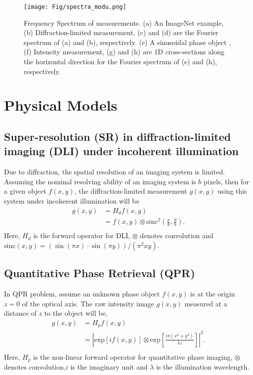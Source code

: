 \documentclass[10pt,twocolumn,letterpaper]{article}
\begin{document}
\begin{figure*}[h]
\centering\texttt{[image: Fig/spectra\_modu.png]}
\caption{Frequency Spectrum of measurements. (a) An ImageNet example, (b) Diffraction-limited measurement, (c) and (d) are the Fourier spectrum of (a) and (b), respectively. (e) A sinusoidal phase object , (f) Intensity measurement, (g) and (h) are 1D cross-sections along the horizontal direction for the Fourier spectrum of (e) and (h), respectively.}
\label{fig:fs}
\end{figure*}

\section{Physical Models}
 \subsection{Super-resolution (SR) in diffraction-limited imaging (DLI) under incoherent illumination}
Due to diffraction, the spatial resolution of an imaging system is limited. Assuming the nominal resolving ability of an imaging system is $b$ pixels, then for a given object $f(x,y)$, the diffraction-limited measurement $g(x,y)$ using this system under incoherent illumination will be \begin{equation}
\begin{aligned}
g(x,y) &=H_{d}f(x,y)\\
&=f(x,y)\otimes\text{sinc}^{2}\left(\frac{x}{b},\frac{y}{b}\right).\\
\end{aligned}
\label{eq:Hd}
\end{equation}
Here, $H_{d}$ is the forward operator for DLI, $\otimes$ denotes convolution and $\text{sinc}(x,y)=(\sin{(\pi x)}\cdot\sin{(\pi y)})/(\pi^{2}xy)$.

\subsection{Quantitative Phase Retrieval (QPR)}
In QPR problem, assume an unknown phase object $f(x,y)$ is at the origin $z=0$ of the optical axis. The raw intensity image $g(x,y)$ measured at a distance of $z$ to the object will be,
\begin{equation}
\begin{aligned}
g(x,y)&=H_{p}f(x,y)\\
&=\left\lvert\text{exp}[if(x,y)]\otimes \text{exp}\left[\frac{i\pi(x^{2}+y^{2})}{\lambda z}\right]\right\lvert^{2}.\\
\end{aligned}
\label{eq:Hp}
\end{equation}
Here, $H_{p}$ is the non-linear forward operator for quantitative phase imaging, $\otimes$ denotes convolution,$i$ is the imaginary unit and $\lambda$ is the illumination wavelength.
\end{document}
